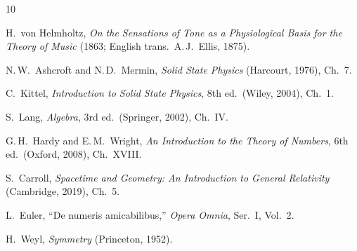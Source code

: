 \documentclass[preprint]{revtex4-2}
\begin{document}
\begin{thebibliography}{10}

H.~von Helmholtz, \emph{On the Sensations of Tone as a Physiological Basis for the Theory of Music} (1863; English trans.\ A.\,J.~Ellis, 1875).

N.\,W.~Ashcroft and N.\,D.~Mermin, \emph{Solid State Physics} (Harcourt, 1976), Ch.~7.

C.~Kittel, \emph{Introduction to Solid State Physics}, 8th ed.\ (Wiley, 2004), Ch.~1.

S.~Lang, \emph{Algebra}, 3rd ed.\ (Springer, 2002), Ch.~IV.

G.\,H.~Hardy and E.\,M.~Wright, \emph{An Introduction to the Theory of Numbers}, 6th ed.\ (Oxford, 2008), Ch.~XVIII.

S.~Carroll, \emph{Spacetime and Geometry: An Introduction to General Relativity} (Cambridge, 2019), Ch.~5.

L.~Euler, ``De numeris amicabilibus,'' \emph{Opera Omnia}, Ser.~I, Vol.~2.

H.~Weyl, \emph{Symmetry} (Princeton, 1952).

\end{thebibliography}
\end{document}
